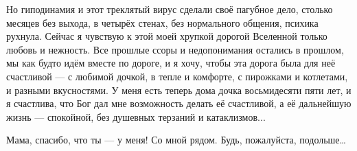 Но гиподинамия и этот треклятый вирус сделали своё пагубное дело, столько
месяцев без выхода,  в четырёх стенах,  без нормального общения,  психика
рухнула.  Сейчас я чувствую к этой моей хрупкой дорогой Вселенной только любовь
и нежность. Все прошлые ссоры и недопонимания остались в прошлом, мы как будто
идём вместе по дороге, и я хочу, чтобы эта дорога была для неё счастливой --- с
любимой дочкой,  в тепле и комфорте, с пирожками и котлетами, и разными
вкусностями. У меня есть теперь дома дочка восьмидесяти пяти лет, и я
счастлива, что Бог дал мне возможность делать её  счастливой, а её дальнейшую
жизнь --- спокойной, без душевных терзаний и катаклизмов... 

Мама, спасибо, что ты --- у меня! Со мной рядом.  Будь, пожалуйста, подольше…
